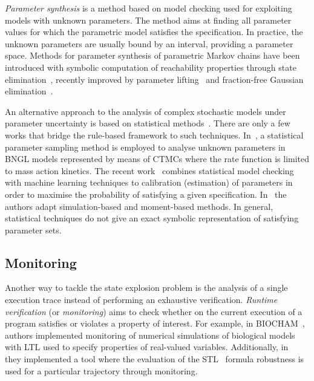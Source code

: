 \documentclass[11pt,a4paper]{report}
\begin{document}
\emph{Parameter synthesis} is a method based on model checking used for exploiting models with unknown parameters. The method aims at finding all parameter values for which the parametric model satisfies the specification. In practice, the unknown parameters are usually bound by an interval, providing a parameter space. Methods for parameter synthesis of parametric Markov chains have been introduced with symbolic computation of reachability properties through state elimination~\cite{daws2004symbolic,jansen2014accelerating,hahn2011probabilistic}, recently improved by parameter lifting~\cite{quatmann2016parameter} and fraction-free Gaussian elimination~\cite{hutschenreiter2017parametric}.

An alternative approach to the analysis of complex stochastic models under
parameter uncertainty is based on statistical methods~\cite{Luck2016,BackenkohlerBW18,Bortolussi2016,Bortolussi2018}. There are only a few works that bridge the rule-based framework to such techniques. In~\cite{liu2016parameter}, a statistical parameter sampling method is employed to analyse unknown parameters in BNGL models represented by means of CTMCs where the rate function is limited to mass action kinetics. The recent work~\cite{KJ18} combines statistical model checking with machine learning techniques to calibration (estimation) of parameters in order to maximise the probability of satisfying a given specification. In~\cite{Bock15} the authors adapt simulation-based and moment-based methods. In general, statistical techniques do not give an exact symbolic representation of satisfying parameter sets. 

\subsection{Monitoring}

Another way to tackle the state explosion problem is the analysis of a single execution trace instead of performing an exhaustive verification. \emph{Runtime verification} (or \emph{monitoring}) aims to check whether on the current execution of a program satisfies or violates a property of interest. For example, in BIOCHAM~\cite{calzone2006biocham}, authors implemented monitoring of numerical simulations of biological models with LTL used to specify properties of real-valued variables. Additionally, in~\cite{donze2010breach} they implemented a tool where the evaluation of the STL~\cite{maler2004monitoring} formula robustness is used for a particular trajectory through monitoring.
\end{document}

